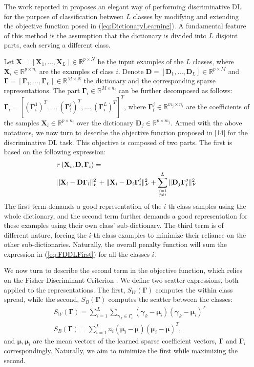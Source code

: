 \documentclass[journal]{IEEEtran}
\newcommand{\bD}{\mathbf{D}}
\newcommand{\bX}{\mathbf{X}}
\newcommand{\bGamma}{\boldsymbol{\Gamma}}
\newcommand{\bgamma}{\boldsymbol{\gamma}}
\newcommand{\bmu}{\boldsymbol{\mu}}
\begin{document}
The work reported in \cite{FDDL} proposes an elegant way of performing discriminative DL for the purpose of classification between $L$ classes by modifying and extending the objective function posed in (\ref{eq:DictionaryLearning}). A fundamental feature of this method is the assumption that the dictionary is divided into $L$ disjoint parts, each serving a different class.

Let $\bX = \left[\bX_1,\ldots,\bX_L\right] \in \mathbb{R}^{p \times N}$ be the input examples of the $L$ classes, where $\bX_i \in \mathbb{R}^{p \times n_i}$ are the examples of class $i$.
Denote $\bD=[\bD_1,\ldots,\bD_L]\in \mathbb{R}^{p \times M}$ and $\bGamma=[\bGamma_1,\ldots,\bGamma_L] \in \mathbb{R}^{M \times N}$ the dictionary and the corresponding sparse representations.
The part $\bGamma_i \in \mathbb{R}^{M \times n_i}$ can be further decomposed as follows: $\bGamma_i=[(\bGamma_i^1)^T,\ldots,(\bGamma_i^j)^T,\ldots,(\bGamma_i^L)^T]^T$, where $\bGamma_i^j \in \mathbb{R}^{m_j \times n_i}$ are the coefficients of the samples $\bX_i \in \mathbb{R}^{p \times n_i}$ over the dictionary $\bD_j \in \mathbb{R}^{p \times m_j}$.
Armed with the above notations, we now turn to describe the objective function proposed in [14] for the discriminative DL task. This objective is composed of two parts. The first
is based on the following expression:
\begin{equation} \label{eq:FDDLFirst}
\begin{split}
& r\left(\bX_i,\bD,\bGamma_i\right) = \\
& \|\bX_i - \bD \bGamma_i\|_F^2 + \|\bX_i - \bD_i \bGamma_i^i\|_F^2 + \sum_{j=1 \atop j \neq i}^L {\|\bD_j \bGamma_i^j\|_F^2}
\end{split}
\end{equation}
The first term demands a good representation of the $i$-th class samples using the whole dictionary, and the second term further demands a good representation for these examples using their own class' sub-dictionary. The third term is of different nature, forcing the $i$-th class examples to minimize their reliance on the other sub-dictionaries. Naturally, the overall penalty function will sum the expression in (\ref{eq:FDDLFirst}) for all the classes $i$.

We now turn to describe the second term in the objective function, which relies on the Fisher Discriminant Criterion \cite{FisherCriterion}. We define two scatter expressions, both applied to the representations. The first, $S_W(\bGamma)$ computes the within class spread, while the second, $S_B(\bGamma)$ computes the scatter between the classes:
\begin{equation}\label{eq:FDDLSecond}
\begin{split}
    & S_W(\bGamma) = \sum\nolimits_{i=1}^L{\sum\nolimits_{\bgamma_k \in \Gamma_i}{(\bgamma_k-\bmu_i)(\bgamma_k-\bmu_i)^T}} \\
    & S_B(\bGamma) = \sum\nolimits_{i=1}^L{n_i (\bmu_i-\bmu)(\bmu_i-\bmu)^T},
\end{split}
\end{equation}
and $\bmu,\bmu_i$ are the mean vectors of the learned sparse coefficient vectors, $\bGamma$ and $\bGamma_i$ correspondingly.  Naturally, we aim to minimize the first while maximizing the second.
\end{document}
